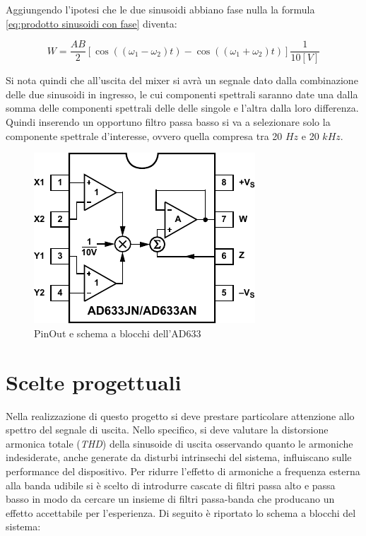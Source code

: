 \documentclass[titlepage]{report}
\begin{document}
	Aggiungendo l'ipotesi che le due sinusoidi abbiano fase nulla la formula \ref*{eq:prodotto sinusoidi con fase} diventa:


	\begin{equation}
		\label{eq:prodotto sinusoidi}
		W = \frac{AB}{2}[\cos ((\omega _1 - \omega _2)t) - \cos ((\omega _1 +\omega _2)t)]\frac{1}{10[V]} 
	\end{equation}
	

	Si nota quindi che all'uscita del mixer si avrà un segnale dato dalla combinazione delle due sinusoidi in ingresso, le cui componenti spettrali saranno date una dalla somma delle componenti spettrali delle delle singole e l'altra dalla loro differenza.
	Quindi inserendo un opportuno filtro passa basso si va a selezionare solo la componente spettrale d'interesse, ovvero quella compresa tra 20 $Hz$ e 20 $kHz$.

	
	\begin{figure}[H]
		\centering
		\includegraphics{Immagini/ad633_pinout.pdf}
		\caption{PinOut e schema a blocchi dell'AD633}
		\label{fig: AD633 schema a blocchi}
	\end{figure}


\chapter{Scelte progettuali}
	\label{ch:scelte}
	
	Nella realizzazione di questo progetto si deve prestare particolare attenzione allo spettro del segnale di uscita. Nello specifico, si deve valutare la distorsione armonica totale (\textit{THD}) della sinusoide di uscita osservando quanto le armoniche indesiderate, anche generate da disturbi intrinsechi del sistema, influiscano sulle performance del dispositivo.
	Per ridurre l'effetto di armoniche a frequenza esterna alla banda udibile si è scelto di introdurre cascate di filtri passa alto e passa basso in modo da cercare un insieme di filtri passa-banda che producano un effetto accettabile per l'esperienza. Di seguito è riportato lo schema a blocchi del sistema:
\end{document}
